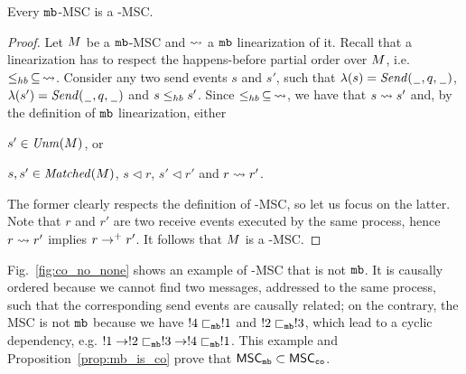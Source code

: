 \begin{proposition} \label{prop:mb_is_co}
	Every $\mathtt{mb}$-MSC is a \co-MSC.
\end{proposition}
\begin{proof}
Let $M$ be a $\mathtt{mb}$-MSC and $\rightsquigarrow$ a $\mathtt{mb}$ linearization of it. Recall that a linearization has to respect the happens-before partial order over $M$, i.e. $\leq_{hb}\,\subseteq\, \rightsquigarrow$. Consider any two send events $s$ and $s'$, such that $\lambda(s)={\mathit{Send}(\hspace{0.1em}\underline{\hspace{0.5em}}\hspace{0.1em},q,\hspace{0.1em}\underline{\hspace{0.5em}}\hspace{0.1em})}$, $\lambda(s')={\mathit{Send}(\hspace{0.1em}\underline{\hspace{0.5em}}\hspace{0.1em},q,\hspace{0.1em}\underline{\hspace{0.5em}}\hspace{0.1em})}$ and $s \leq_{hb} s'$. Since $\leq_{hb}\,\subseteq\, \rightsquigarrow$, we have that $s \rightsquigarrow s'$ and, by the definition of $\mathtt{mb}$ linearization, either
\begin{enumerate*}[label={(\roman*)}]
	\item $s' \in \mathit{Unm}(M)$, or 
	\item $s,s' \in \mathit{Matched}(M)$, $s \lhd r$, $s' \lhd r'$ and $r \rightsquigarrow r'$. 
\end{enumerate*}
The former clearly respects the definition of \co-MSC, so let us focus on the latter. Note that $r$ and $r'$ are two receive events executed by the same process, hence $r \rightsquigarrow r'$ implies $r \to^+ r'$. It follows that $M$ is a \co-MSC.
\end{proof}

Fig.~\ref{fig:co_no_none} shows an example of \co-MSC that is not $\mathtt{mb}$. It is causally ordered because we cannot  find two messages, addressed to the same process, such that the corresponding send events are causally related; on the contrary, the MSC is not $\mathtt{mb}$ because we have $!4 \sqsubset_{\mathtt{mb}} !1$ and $!2 \sqsubset_{\mathtt{mb}} !3$, which lead to a cyclic dependency, e.g. $!1 \to !2 \sqsubset_{\mathtt{mb}} !3 \to !4 \sqsubset_{\mathtt{mb}} !1$. This example and Proposition~\ref{prop:mb_is_co} prove that $\mathsf{MSC}_{\mathtt{mb}} \subset \mathsf{MSC}_{\mathtt{co}}$.

